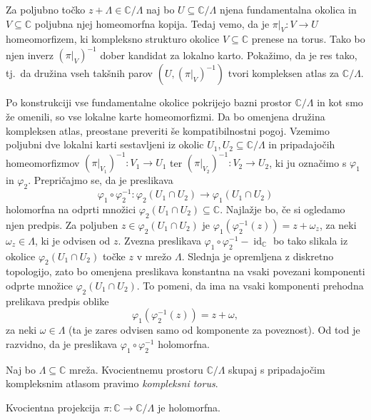 \documentclass[mat1]{fmfdelo}
\numberwithin{equation}{section}
\newcommand{\C}{\mathbb C}
\newcommand{\om}{\omega}
\newcommand{\inv}{^{-1}}
\newcommand{\torus}{\C/\Lambda}
\newcommand{\tj}{tj.\ }
\DeclareMathOperator{\id}{id}
\theoremstyle{definition}
\begin{document}
\begin{dokaz}
    Za poljubno točko $z + \Lambda \in \torus$ naj bo $U \subseteq \torus$ njena fundamentalna okolica in $V \subseteq \C$ poljubna njej homeomorfna kopija. Tedaj vemo, da je $\pi|_V : V \to U$ homeomorfizem, ki kompleksno strukturo okolice $V \subseteq \C$ prenese na torus. Tako bo njen inverz $(\pi|_V)\inv$ dober kandidat za lokalno karto. Pokažimo, da je res tako, \tj da družina vseh takšnih parov $(U, (\pi|_V)\inv)$ tvori kompleksen atlas za $\torus$. 

    Po konstrukciji vse fundamentalne okolice pokrijejo bazni prostor $\torus$ in kot smo že omenili, so vse lokalne karte homeomorfizmi. Da bo omenjena družina kompleksen atlas, preostane preveriti še kompatibilnostni pogoj. Vzemimo poljubni dve lokalni karti sestavljeni iz okolic $U_1, U_2 \subseteq \torus$ in pripadajočih homeomorfizmov $(\pi|_{V_1})\inv : V_1 \to U_1$ ter $(\pi|_{V_2})\inv : V_2 \to U_2$, ki ju označimo s $\varphi_1$ in $\varphi_2$. Prepričajmo se, da je preslikava 
    \[
        \varphi_1 \circ \varphi_2\inv : \varphi_2(U_1 \cap U_2) \longrightarrow  \varphi_1(U_1 \cap U_2)
    \]
    holomorfna na odprti množici $\varphi_2(U_1 \cap U_2) \subseteq \C$. Najlažje bo, če si ogledamo njen predpis. Za poljuben $z \in \varphi_2(U_1 \cap U_2)$ je $\varphi_1(\varphi_2\inv(z)) = z + \om_z$, za neki $\om_z \in \Lambda$, ki je odvisen od $z$. Zvezna preslikava $\varphi_1 \circ \varphi_2\inv - \id_\C$ bo tako slikala iz okolice $\varphi_2(U_1 \cap U_2)$ točke $z$ v mrežo $\Lambda$. Slednja je opremljena z diskretno topologijo, zato bo omenjena preslikava konstantna na vsaki povezani komponenti odprte množice $\varphi_2(U_1 \cap U_2)$. To pomeni, da ima na vsaki komponenti prehodna prelikava predpis oblike 
    \[
        \varphi_1(\varphi_2\inv(z)) = z + \om,
    \]
    za neki $\om \in \Lambda$ (ta je zares odvisen samo od komponente za poveznost). Od tod je razvidno, da je preslikava $\varphi_1 \circ \varphi_2\inv$ holomorfna. 
\end{dokaz}

\begin{definicija}
    Naj bo $\Lambda \subseteq \C$ mreža. Kvocientnemu prostoru $\torus$ skupaj s pripadajočim kompleksnim atlasom pravimo \emph{kompleksni torus}.  
\end{definicija}

\begin{lema}
    \label{holomorfnost projekcije}
    Kvocientna projekcija $\pi : \C \to \torus$ je holomorfna. 
\end{lema}
\end{document}
